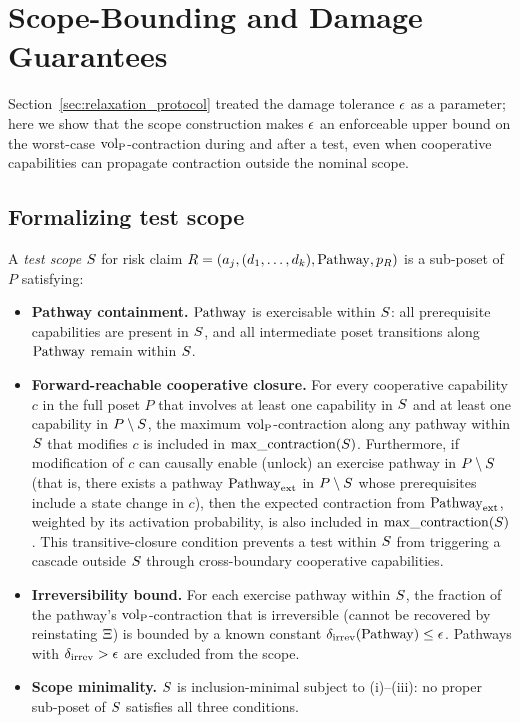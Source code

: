 \section{Scope-Bounding and Damage Guarantees}
\label{sec:damage_guarantees}

Section~\ref{sec:relaxation_protocol} treated the damage tolerance
$\epsilon$ as a parameter; here we show that the scope
construction makes $\epsilon$ an enforceable upper bound on
the worst-case ${\operatorname{vol}_{\mathrm{P}}}$-contraction during and after a test, even
when cooperative capabilities can propagate contraction outside
the nominal scope.

\subsection{Formalizing test scope}

\begin{definition}
\label{def:test_scope}
A \emph{test scope} $S$ for risk claim
$R = (a_j, (d_1, \ldots, d_k), \mathrm{Pathway}, p_R)$ is a sub-poset of
$P$ satisfying:
\begin{itemize}
\item[(i)] \textbf{Pathway containment.}
  $\mathrm{Pathway}$ is exercisable within $S$: all prerequisite
  capabilities are present in $S$, and all intermediate
  poset transitions along $\mathrm{Pathway}$ remain within $S$.
\item[(ii)] \textbf{Forward-reachable cooperative closure.}
  For every cooperative capability $c$ in the full poset $P$ that
  involves at least one capability in $S$ and at least one
  capability in $P \setminus S$, the maximum
  ${\operatorname{vol}_{\mathrm{P}}}$-contraction along any pathway within $S$ that
  modifies $c$ is included in $\mathrm{max\_contraction}(S)$.  Furthermore, if
  modification of $c$ can causally enable (unlock) an exercise
  pathway in $P \setminus S$ (that is, there exists a
  pathway $\mathrm{Pathway}_{\mathrm{ext}}$ in $P \setminus S$ whose
  prerequisites include a state change in $c$), then the expected
  contraction from $\mathrm{Pathway}_{\mathrm{ext}}$, weighted by its
  activation probability, is also included in $\mathrm{max\_contraction}(S)$.
  This transitive-closure condition prevents a test within
  $S$ from triggering a cascade outside $S$ through
  cross-boundary cooperative capabilities.
\item[(iii)] \textbf{Irreversibility bound.}
  For each exercise pathway within $S$, the fraction of the
  pathway's ${\operatorname{vol}_{\mathrm{P}}}$-contraction that is irreversible (cannot be
  recovered by reinstating $\Xi$) is bounded by a known
  constant $\delta_{\mathrm{irrev}}(\mathrm{Pathway}) \leq \epsilon$.  Pathways
  with $\delta_{\mathrm{irrev}} > \epsilon$ are excluded from the scope.
\item[(iv)] \textbf{Scope minimality.}
  $S$ is inclusion-minimal subject to
  (i)--(iii): no proper sub-poset of $S$ satisfies all three
  conditions.
\end{itemize}
\end{definition}

